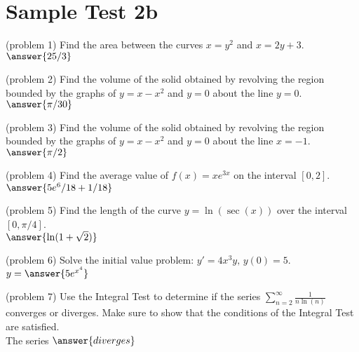\documentclass[handout]{ximera}
\begin{document}
\section{Sample Test 2b}

\begin{problem}(problem 1)
Find the area between the curves $x = y^2$ and $x = 2y + 3$.\\
$\answer{25/3}$
\end{problem}


\begin{problem}(problem 2)
Find the volume of the solid obtained by revolving the region bounded by the 
graphs of $y = x-x^2$ and $y = 0$ about the line $ y = 0$.\\
$\answer{\pi/30}$
\end{problem}


\begin{problem}(problem 3)
Find the volume of the solid obtained by revolving the region bounded by the 
graphs of $y = x-x^2$ and $y = 0$ about the line $x = -1$.\\
$\answer{\pi/2}$
\end{problem}


\begin{problem}(problem 4)
Find the average value of $f(x) = xe^{3x}$ on the interval $[0, 2]$.\\
$\answer{5e^6/18  + 1/18}$
\end{problem}


\begin{problem}(problem 5)
Find the length of the curve $\displaystyle y = \ln(\sec(x))$ over the interval $[0, \pi/4]$.\\
$\answer{\ln(1 + \sqrt{2})}$
\end{problem}


\begin{problem}(problem 6)
Solve the initial value problem: $\displaystyle y' = 4x^3 y,\, y(0) = 5$.\\
$y = \answer{5e^{x^4}}$
\end{problem}


\begin{problem}(problem 7)
Use the Integral Test to determine if the series $\displaystyle \sum_{n=2}^\infty \frac{1}{n\ln(n)}$
converges or diverges. Make sure to show that the
conditions of the Integral Test are satisfied.\\
The series $\answer{diverges}$
\end{problem}
\end{document}
